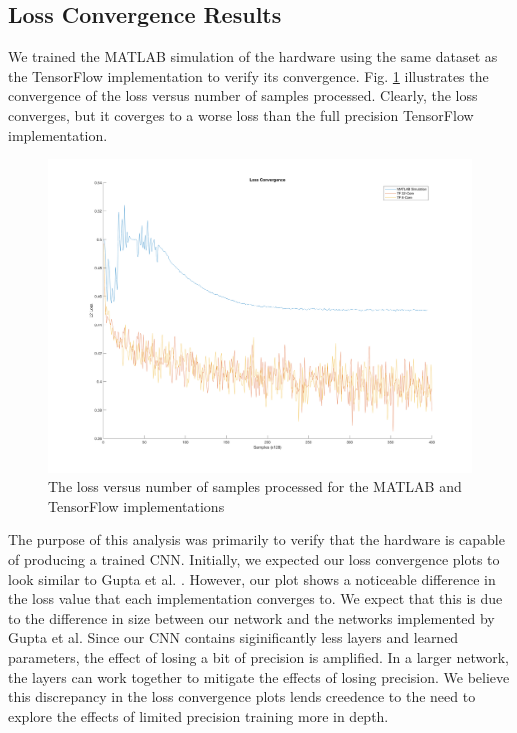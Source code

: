 \subsection{Loss Convergence Results}
We trained the MATLAB simulation of the hardware using the same dataset as the TensorFlow implementation to verify its convergence. Fig. \ref{fig:loss-plot} illustrates the convergence of the loss versus number of samples processed. Clearly, the loss converges, but it coverges to a worse loss than the full precision TensorFlow implementation.
\begin{figure}[ht]
	\centering
	\includegraphics[scale=0.17]{../all_loss_plot.png}
	\caption{The loss versus number of samples processed for the MATLAB and TensorFlow implementations}
	\label{fig:loss-plot}
\end{figure}
The purpose of this analysis was primarily to verify that the hardware is capable of producing a trained CNN. Initially, we expected our loss convergence plots to look similar to Gupta et al. \cite{limited-precision}. However, our plot shows a noticeable difference in the loss value that each implementation converges to. We expect that this is due to the difference in size between our network and the networks implemented by Gupta et al. Since our CNN contains siginificantly less layers and learned parameters, the effect of losing a bit of precision is amplified. In a larger network, the layers can work together to mitigate the effects of losing precision. We believe this discrepancy in the loss convergence plots lends creedence to the need to explore the effects of limited precision training more in depth.